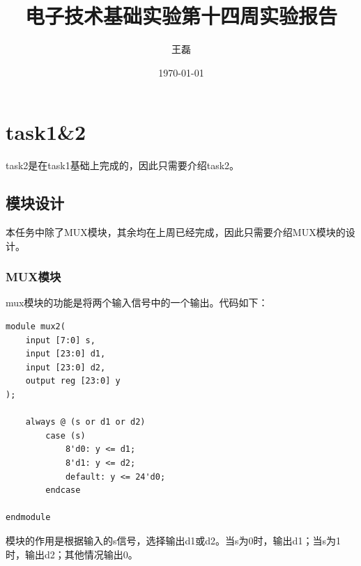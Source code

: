 \documentclass[UTF8]{ctexart}
\title{电子技术基础实验第十四周实验报告}
\author{王磊\quad2022012972}
\date{\today}
\begin{document}
\maketitle
\section{task1\&2}
task2是在task1基础上完成的，因此只需要介绍task2。
\subsection{模块设计}
本任务中除了MUX模块，其余均在上周已经完成，因此只需要介绍MUX模块的设计。
\subsubsection{MUX模块}
mux模块的功能是将两个输入信号中的一个输出。代码如下：
\begin{framed}
    \begin{lstlisting}[style=verilogStyle]
module mux2(
    input [7:0] s,
    input [23:0] d1,
    input [23:0] d2,
    output reg [23:0] y
);

    always @ (s or d1 or d2)
        case (s)
            8'd0: y <= d1;
            8'd1: y <= d2;
            default: y <= 24'd0;
        endcase

endmodule
    \end{lstlisting}
\end{framed}

模块的作用是根据输入的s信号，选择输出d1或d2。当s为0时，输出d1；当s为1时，输出d2；其他情况输出0。
\end{document}

